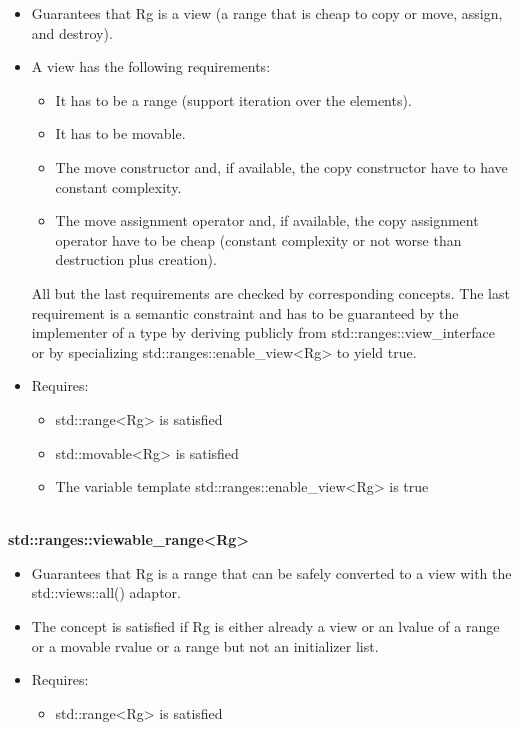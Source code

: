 \begin{itemize}
\item
Guarantees that Rg is a view (a range that is cheap to copy or move, assign, and destroy).

\item
A view has the following requirements:

\begin{itemize}
\item
It has to be a range (support iteration over the elements).

\item
It has to be movable.

\item
The move constructor and, if available, the copy constructor have to have constant complexity.

\item
The move assignment operator and, if available, the copy assignment operator have to be cheap (constant complexity or not worse than destruction plus creation).
\end{itemize}

All but the last requirements are checked by corresponding concepts. The last requirement is a semantic constraint and has to be guaranteed by the implementer of a type by deriving publicly from std::ranges::view\_interface or by specializing std::ranges::enable\_view<Rg> to yield true.

\item
Requires:

\begin{itemize}
\item
std::range<Rg> is satisfied

\item
std::movable<Rg> is satisfied

\item
The variable template std::ranges::enable\_view<Rg> is true
\end{itemize}
\end{itemize}

\noindent
\hspace*{\fill} \\ %
\textbf{std::ranges::viewable\_range<Rg>}

\begin{itemize}
\item
Guarantees that Rg is a range that can be safely converted to a view with the std::views::all() adaptor.

\item
The concept is satisfied if Rg is either already a view or an lvalue of a range or a movable rvalue or a range but not an initializer list.

\item
Requires:

\begin{itemize}
\item
std::range<Rg> is satisfied

\end{itemize}
\end{itemize}

